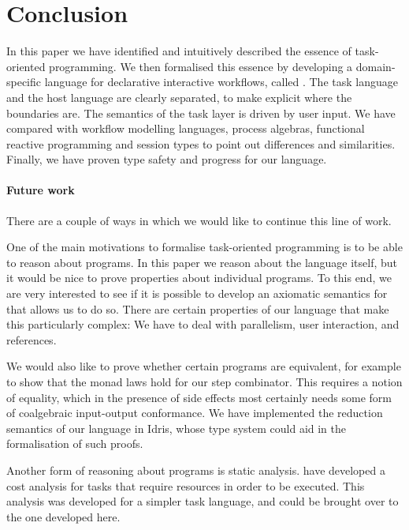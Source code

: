 
\section{Conclusion}

\label{sec:conclusions}

In this paper we have identified and intuitively described the essence of task-oriented programming.
We then formalised this essence by developing a domain-specific language for declarative interactive workflows, called \TOPHAT.
The task language and the host language are clearly separated, to make explicit where the boundaries are.
The semantics of the task layer is driven by user input.
We have compared \TOPHAT with workflow modelling languages, process algebras, functional reactive programming and session types to point out differences and similarities.
Finally, we have proven type safety and progress for our language.

\paragraph{Future work}

There are a couple of ways in which we would like to continue this line of work.

One of the main motivations to formalise task-oriented programming is to be able to reason about programs.
In this paper we reason about the language itself, but it would be nice to prove properties about individual programs.
To this end, we are very interested to see if it is possible to develop an axiomatic semantics for \TOPHAT that allows us to do so.
There are certain properties of our language that make this particularly complex:
We have to deal with parallelism, user interaction, and references.

We would also like to prove whether certain programs are equivalent, for example to show that the monad laws hold for our step combinator.
This requires a notion of equality, which in the presence of side effects most certainly needs some form of coalgebraic input-output conformance.
We have implemented the reduction semantics of our language in Idris, whose type system could aid in the formalisation of such proofs.

Another form of reasoning about programs is static analysis.
\citet{conf/ifl/KlinikJP17} have developed a cost analysis for tasks that require resources in order to be executed.
This analysis was developed for a simpler task language, and could be brought over to the one developed here.

